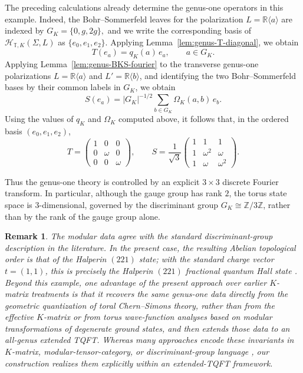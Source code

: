 \documentclass[12pt]{amsart}
\numberwithin{equation}{section}
\newtheorem*{remark}{Remark}
\begin{document}
The preceding calculations already determine the genus-one operators in this example.
Indeed, the Bohr--Sommerfeld leaves for the polarization $L=\mathbb{R}\langle a\rangle$
are indexed by $G_K=\{0,g,2g\},$ and we write the corresponding basis of $\mathcal H_{\mathbb T,K}(\Sigma,L)$ as $\{e_0,e_1,e_2\}.$ Applying Lemma~\ref{lem:genus-T-diagonal}, we obtain
\[
T(e_a)=q_K(a)\,e_a,\qquad a\in G_K.
\]
Applying Lemma~\ref{lem:genus-BKS-fourier} to the transverse genus-one
polarizations $L=\mathbb{R}\langle a\rangle$ and $L'=\mathbb{R}\langle b\rangle$,
and identifying the two Bohr--Sommerfeld bases by their common labels in $G_K$,
we obtain
\[
S(e_a)=|G_K|^{-1/2}\sum_{b\in G_K}\Omega_K(a,b)\,e_b.
\]
Using the values of $q_K$ and $\Omega_K$ computed above, it follows that, in the
ordered basis $(e_0,e_1,e_2)$,
\[
T=
\begin{pmatrix}
1&0&0\\
0&\omega&0\\
0&0&\omega
\end{pmatrix},
\qquad
S=
\frac{1}{\sqrt{3}}
\begin{pmatrix}
1&1&1\\
1&\omega^2&\omega\\
1&\omega&\omega^2
\end{pmatrix}.
\]


Thus the genus-one theory is controlled by an explicit $3\times 3$ discrete Fourier
transform. In particular, although the gauge group has rank \(2\), the torus state space is \(3\)-dimensional, governed by the discriminant group \(G_K\cong \mathbb Z/3\mathbb Z\), rather than by the rank of the gauge group alone.

\begin{remark}
The modular data agree with the standard discriminant-group description in the literature. In the present case, the resulting Abelian topological order is that of the Halperin \((221)\) state; with the standard charge vector \(t=(1,1)\), this is precisely the Halperin \((221)\) fractional quantum Hall state \cite{Halperin1983}. Beyond this example, one advantage of the present approach over earlier \(K\)-matrix treatments \cite{wenzee1992,KeskiVakkuriWen1993,Wen2016} is that it recovers the same genus-one data directly from the geometric quantization of toral Chern--Simons theory, rather than from the effective \(K\)-matrix or from torus wave-function analyses based on modular transformations of degenerate ground states, and then extends those data to an all-genus extended TQFT. Whereas many approaches encode these invariants in \(K\)-matrix, modular-tensor-category, or discriminant-group language \cite{BelovMoore,Stirling,Wen2016,LuVishwanath2016}, our construction realizes them explicitly within an extended-TQFT framework.
\end{remark}
\end{document}
